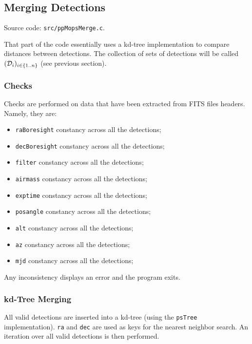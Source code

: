 \documentclass[panstarrs,spec]{panstarrs}
\begin{document}
\subsection{Merging Detections}
\label{sec-implementation-merge}

Source code: \texttt{src/ppMopsMerge.c}.

That part of the code essentially uses a kd-tree implementation to
compare distances between detections. The collection of sets of
detections will be called $({\cal D}_{i})_{i \in \{1..n\}}$ (see
previous section). 

\subsubsection{Checks}
\label{sec-implementation-merge-checks}

Checks are performed on data that have been extracted from FITS files
headers. Namely, they are:
\begin{itemize}
\item \texttt{raBoresight} constancy across all the detections;
\item \texttt{decBoresight} constancy across all the detections;
\item \texttt{filter} constancy across all the detections;
\item \texttt{airmass} constancy across all the detections;
\item \texttt{exptime} constancy across all the detections;
\item \texttt{posangle} constancy across all the detections;
\item \texttt{alt} constancy across all the detections;
\item \texttt{az} constancy across all the detections;
\item \texttt{mjd} constancy across all the detections;
\end{itemize}

Any inconsistency displays an error and the program exits.

\subsubsection{kd-Tree Merging}
\label{sec-implementation-merge-kdtree}

All valid detections are inserted into a kd-tree (using the
\texttt{psTree} implementation). \texttt{ra} and \texttt{dec} are used
as keys for the nearest neighbor search. An iteration over all valid
detections is then performed. 
\end{document}
